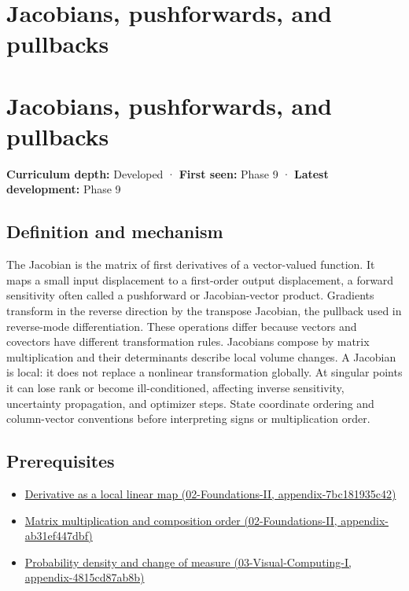 \hypertarget{appendix-d8a7ddb675eb}{}
\section*{Jacobians, pushforwards, and pullbacks}
\section{Jacobians, pushforwards, and pullbacks}\label{jacobians-pushforwards-and-pullbacks}

\textbf{Curriculum depth:} Developed · \textbf{First seen:} Phase 9 · \textbf{Latest development:} Phase 9

\subsection{Definition and mechanism}\label{definition-and-mechanism}

The Jacobian is the matrix of first derivatives of a vector-valued function. It maps a small input displacement to a first-order output displacement, a forward sensitivity often called a pushforward or Jacobian-vector product. Gradients transform in the reverse direction by the transpose Jacobian, the pullback used in reverse-mode differentiation. These operations differ because vectors and covectors have different transformation rules. Jacobians compose by matrix multiplication and their determinants describe local volume changes. A Jacobian is local: it does not replace a nonlinear transformation globally. At singular points it can lose rank or become ill-conditioned, affecting inverse sensitivity, uncertainty propagation, and optimizer steps. State coordinate ordering and column-vector conventions before interpreting signs or multiplication order.

\subsection{Prerequisites}\label{prerequisites}

\begin{itemize}
\tightlist
\item
  \href{}{Derivative as a local linear map (02-Foundations-II, appendix-7bc181935c42)}
\item
  \href{}{Matrix multiplication and composition order (02-Foundations-II, appendix-ab31ef447dbf)}
\item
  \href{}{Probability density and change of measure (03-Visual-Computing-I, appendix-4815cd87ab8b)}
\end{itemize}


